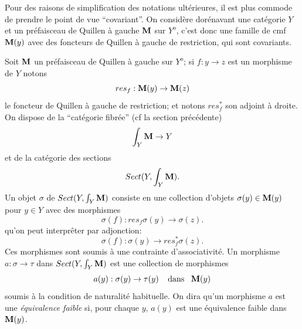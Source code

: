 \documentclass[12pt]{article}
\newcommand{\mm}{{\bf M}}
\begin{document}
Pour des raisons de simplification des notations ult\'erieures, il est plus
commode de prendre le
point de vue ``covariant''. On consid\`ere dor\'enavant une cat\'egorie $Y$ et
un pr\'efaisceau de
Quillen \`a gauche $\mm$ sur $Y^o$, c'est donc une famille de cmf $\mm (y)$ avec
des foncteurs de Quillen \`a gauche de restriction, qui sont covariants.



Soit $\mm$ un pr\'efaisceau de Quillen \`a gauche sur $Y^o$; si $f: y\rightarrow
z$ est un morphisme de $Y$ notons
$$
res_f: \mm (y)\rightarrow \mm (z)
$$
le foncteur de Quillen \`a gauche de restriction; et notons $res_f^{\ast}$
son adjoint \`a droite. On dispose de la
``cat\'egorie fibr\'ee'' (cf la section pr\'ec\'edente)
$$
\int _Y\mm \rightarrow Y
$$
et de la cat\'egorie des sections
$$
Sect (Y,\int _Y\mm ).
$$
Un objet $\sigma$ de $Sect (Y,\int _Y\mm )$ consiste en une collection
d'objets $\sigma (y)\in
\mm (y)$ pour $y\in Y$ avec des morphismes
$$
\sigma (f): res_f\sigma (y)\rightarrow \sigma (z).
$$
qu'on peut interpr\^eter par adjonction:
$$
\sigma (f): \sigma (y)\rightarrow res_f^{\ast}\sigma (z).
$$
Ces morphismes sont soumis \`a une contrainte d'associativit\'e.
Un morphisme $a:\sigma \rightarrow \tau$ dans $Sect (Y,\int _Y\mm )$
est une collection de morphismes
$$
a(y): \sigma (y)\rightarrow \tau (y)\;\;\;\; \mbox{dans}\;\;\; \mm (y)
$$
soumis \`a la condition de naturalit\'e habituelle.
On dira qu'un morphisme $a$ est une {\em \'equivalence faible} si, pour
chaque $y$, $a(y)$ est une  \'equivalence faible dans $\mm (y)$.
\end{document}
